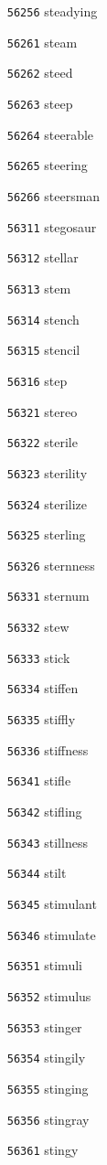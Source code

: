 \documentclass[twoside,11pt]{article}
\begin{document}
\begin{multicols}{5}
\begin{enumerate}
\item[\texttt{56256}] steadying
\item[\texttt{56261}] steam
\item[\texttt{56262}] steed
\item[\texttt{56263}] steep
\item[\texttt{56264}] steerable
\item[\texttt{56265}] steering
\item[\texttt{56266}] steersman
\item[\texttt{56311}] stegosaur
\item[\texttt{56312}] stellar
\item[\texttt{56313}] stem
\item[\texttt{56314}] stench
\item[\texttt{56315}] stencil
\item[\texttt{56316}] step
\item[\texttt{56321}] stereo
\item[\texttt{56322}] sterile
\item[\texttt{56323}] sterility
\item[\texttt{56324}] sterilize
\item[\texttt{56325}] sterling
\item[\texttt{56326}] sternness
\item[\texttt{56331}] sternum
\item[\texttt{56332}] stew
\item[\texttt{56333}] stick
\item[\texttt{56334}] stiffen
\item[\texttt{56335}] stiffly
\item[\texttt{56336}] stiffness
\item[\texttt{56341}] stifle
\item[\texttt{56342}] stifling
\item[\texttt{56343}] stillness
\item[\texttt{56344}] stilt
\item[\texttt{56345}] stimulant
\item[\texttt{56346}] stimulate
\item[\texttt{56351}] stimuli
\item[\texttt{56352}] stimulus
\item[\texttt{56353}] stinger
\item[\texttt{56354}] stingily
\item[\texttt{56355}] stinging
\item[\texttt{56356}] stingray
\item[\texttt{56361}] stingy

\end{enumerate}
\end{multicols}
\end{document}
